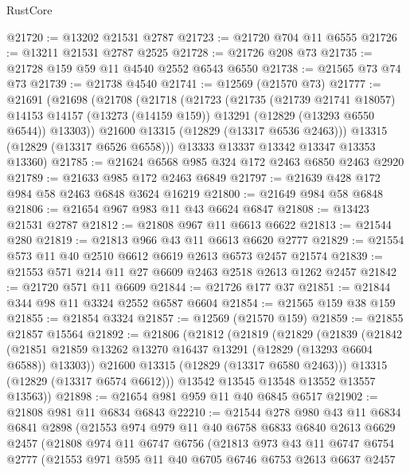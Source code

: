 \begin{lexlean}{RustCore}
\begin{coremodule}
@21720 := @13202 @21531 @2787
@21723 := @21720 @704 @11 @6555
@21726 := @13211 @21531 @2787 @2525
@21728 := @21726 @208 @73
@21735 := @21728 @159 @59 @11 @4540 @2552 @6543 @6550
@21738 := @21565 @73 @74 @73
@21739 := @21738 @4540
@21741 := @12569 (@21570 @73)
@21777 := @21691
    (@21698
      (@21708
        (@21718
          (@21723
            (@21735
              (@21739 @21741 @18057)
              @14153
              @14157
              (@13273 (@14159 @159))
              @13291
              (@12829 (@13293 @6550 @6544))
              @13303))
          @21600
          @13315
          (@12829 (@13317 @6536 @2463)))
        @13315
        (@12829 (@13317 @6526 @6558)))
      @13333
      @13337
      @13342
      @13347
      @13353
      @13360)
@21785 := @21624 @6568 @985 @324 @172 @2463 @6850 @2463 @2920
@21789 := @21633 @985 @172 @2463 @6849
@21797 := @21639 @428 @172 @984 @58 @2463 @6848 @3624 @16219
@21800 := @21649 @984 @58 @6848
@21806 := @21654 @967 @983 @11 @43 @6624 @6847
@21808 := @13423 @21531 @2787
@21812 := @21808 @967 @11 @6613 @6622
@21813 := @21544 @280
@21819 := @21813 @966 @43 @11 @6613 @6620 @2777
@21829 := @21554 @573 @11 @40 @2510 @6612 @6619 @2613 @6573 @2457 @21574
@21839 := @21553 @571 @214 @11 @27 @6609 @2463 @2518 @2613 @1262 @2457
@21842 := @21720 @571 @11 @6609
@21844 := @21726 @177 @37
@21851 := @21844 @344 @98 @11 @3324 @2552 @6587 @6604
@21854 := @21565 @159 @38 @159
@21855 := @21854 @3324
@21857 := @12569 (@21570 @159)
@21859 := @21855 @21857 @15564
@21892 := @21806
    (@21812
      (@21819
        (@21829
          (@21839
            (@21842
              (@21851 @21859 @13262 @13270 @16437 @13291 (@12829 (@13293 @6604 @6588)) @13303))
            @21600
            @13315
            (@12829 (@13317 @6580 @2463)))
          @13315
          (@12829 (@13317 @6574 @6612)))
        @13542
        @13545
        @13548
        @13552
        @13557
        @13563))
@21898 := @21654 @981 @959 @11 @40 @6845 @6517
@21902 := @21808 @981 @11 @6834 @6843
@22210 := @21544
    @278
    @980
    @43
    @11
    @6834
    @6841
    @2898
    (@21553
      @974
      @979
      @11
      @40
      @6758
      @6833
      @6840
      @2613
      @6629
      @2457
      (@21808
        @974
        @11
        @6747
        @6756
        (@21813
          @973
          @43
          @11
          @6747
          @6754
          @2777
          (@21553
            @971
            @595
            @11
            @40
            @6705
            @6746
            @6753
            @2613
            @6637
            @2457

\end{coremodule}
\end{lexlean}
